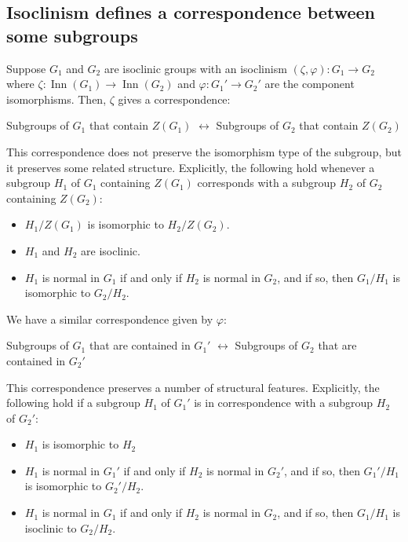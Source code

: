 \documentclass{ucetd}
\begin{document}
\subsection{Isoclinism defines a correspondence between some subgroups}

Suppose $G_1$ and $G_2$ are isoclinic groups with an isoclinism
$(\zeta,\varphi): G_1 \to G_2$ where $\zeta:\operatorname{Inn}(G_1)
\to \operatorname{Inn}(G_2)$ and $\varphi:G_1' \to G_2'$ are the
component isomorphisms. Then, $\zeta$ gives a correspondence:

\begin{center}
Subgroups of $G_1$ that contain $Z(G_1)$ $\leftrightarrow$ Subgroups
of $G_2$ that contain $Z(G_2)$
\end{center}
This correspondence does not preserve the isomorphism type of the
subgroup, but it preserves some related structure. Explicitly, the
following hold whenever a subgroup $H_1$ of $G_1$ containing $Z(G_1)$
corresponds with a subgroup $H_2$ of $G_2$ containing $Z(G_2)$:

\begin{itemize}
\item $H_1/Z(G_1)$ is isomorphic to $H_2/Z(G_2)$.
\item $H_1$ and $H_2$ are isoclinic.
\item $H_1$ is normal in $G_1$ if and only if $H_2$ is normal in
  $G_2$, and if so, then $G_1/H_1$ is isomorphic to $G_2/H_2$.
\end{itemize}

We have a similar correspondence given by $\varphi$:

\begin{center}
  Subgroups of $G_1$ that are contained in $G_1'$ $\leftrightarrow$
  Subgroups of $G_2$ that are contained in $G_2'$
\end{center}

This correspondence preserves a number of structural
features. Explicitly, the following hold if a subgroup $H_1$ of $G_1'$
is in correspondence with a subgroup $H_2$ of $G_2'$:

\begin{itemize}
\item $H_1$ is isomorphic to $H_2$
\item $H_1$ is normal in $G_1'$ if and only if $H_2$ is normal in
  $G_2'$, and if so, then $G_1'/H_1$ is isomorphic to $G_2'/H_2$.
\item $H_1$ is normal in $G_1$ if and only if $H_2$ is normal in
  $G_2$, and if so, then $G_1/H_1$ is isoclinic to $G_2/H_2$.
\end{itemize}
\end{document}
